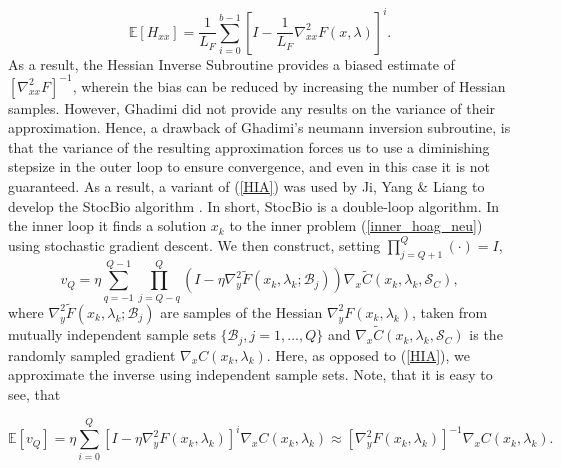 \documentclass[11pt, twoside]{report}
\begin{document}
\[\mathbb{E}[H_{xx}] = \frac{1}{L_F} \sum_{i=0}^{b-1}\left[I-\frac{1}{L_F} \nabla^2_{xx} F(x,\lambda)\right]^i.\]
As a result, the Hessian Inverse Subroutine provides a biased estimate of $[\nabla_{xx}^2 F]^{-1}$, wherein the bias can be reduced by increasing the number of Hessian samples. However, Ghadimi did not provide any results on the variance of their approximation. Hence, a drawback of Ghadimi's neumann inversion subroutine, is that the variance of the resulting approximation forces us to use a diminishing stepsize in the outer loop to ensure convergence, and even in this case it is not guaranteed. As a result, a variant of (\ref{HIA}) was used by Ji, Yang \& Liang to develop the StocBio algorithm \cite{ji2021bilevel}. In short, StocBio is a double-loop algorithm. In the inner loop it finds a solution $x_k$ to the inner problem (\ref{inner_hoag_neu}) using stochastic gradient descent. We then construct, setting $\prod_{j=Q+1}^Q(\cdot) = I$,
\begin{equation} \label{HIA_StocBio}
    v_Q= \eta \sum_{q=-1}^{Q-1} \prod_{j=Q-q}^Q\left(I- \eta \nabla_y^2 \tilde{F}\left(x_k, \lambda_k ; \mathcal{B}_j\right)\right) \nabla_x \tilde{C}(x_k,\lambda_k,\mathcal{S}_C),
\end{equation}
where $\nabla_y^2 \tilde{F}\left(x_k, \lambda_k ; \mathcal{B}_j\right)$ are samples of the Hessian $\nabla_y^2 F \left(x_k, \lambda_k\right)$, taken from mutually independent sample sets $\{\mathcal{B}_j, j = 1, \hdots, Q\}$ and $\nabla_x \tilde{C}(x_k,\lambda_k,\mathcal{S}_C)$ is the randomly sampled gradient $\nabla_x C(x_k,\lambda_k)$. Here, as opposed to (\ref{HIA}), we approximate the inverse using independent sample sets. Note, that it is easy to see, that

\[\mathbb{E}[v_Q] = \eta \sum_{i=0}^{Q} \left[I - \eta\nabla_y^2 F \left(x_k, \lambda_k\right)\right]^i\nabla_x C(x_k,\lambda_k) \approx [\nabla_y^2 F \left(x_k, \lambda_k\right)]^{-1}\nabla_x C(x_k,\lambda_k).\]
\end{document}
